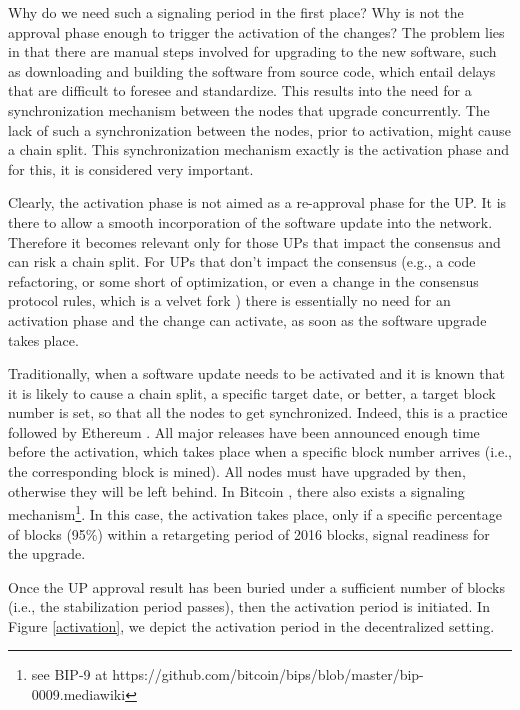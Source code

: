 Why do we need such a signaling period in the first place? Why is not the approval phase enough to trigger the activation of the changes? The problem lies in that there are manual steps involved for upgrading to the new software, such as downloading and building the software from source code, which entail delays that are difficult to foresee and standardize. This results into the need for a synchronization mechanism between the nodes that upgrade concurrently. The lack of such a synchronization between the nodes, prior to activation, might cause a chain split. This synchronization mechanism exactly is the activation phase and for this, it is considered very important. 

Clearly, the activation phase is not aimed as a re-approval phase for the UP. It is there to allow a smooth incorporation of the software update into the network. Therefore it becomes relevant only for those UPs that impact the consensus and can risk a chain split. For UPs that don't impact the consensus (e.g., a code refactoring, or some short of optimization, or even a change in the consensus protocol rules, which is a velvet fork \cite{velvet}) there is essentially no need for an activation phase and the change can activate, as soon as the software upgrade takes place.

Traditionally, when a software update needs to be activated and it is known that it is likely to cause a chain split, a specific target date, or better, a target block number is set, so that all the nodes to get synchronized. Indeed, this is a practice followed by Ethereum \cite{ethereum}. All major releases have been announced enough time before the activation, which takes place when a specific block number arrives (i.e., the corresponding block is mined). All nodes must have upgraded by then, otherwise they will be left behind. In Bitcoin \cite{bitcoin}, there also exists a signaling mechanism\footnote{see BIP-9 at https://github.com/bitcoin/bips/blob/master/bip-0009.mediawiki}. In this case, the activation takes place, only if a specific percentage of blocks (95\%) within a retargeting period of 2016 blocks, signal readiness for the upgrade. 

Once the UP approval result has been buried under a sufficient number of blocks (i.e., the stabilization period passes), then the activation period is initiated. In Figure \ref{activation}, we depict the activation period in the decentralized setting.

